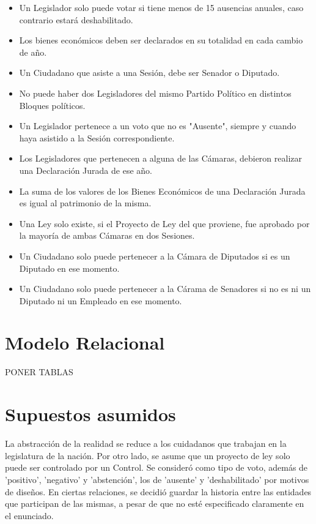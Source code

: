\begin{itemize}
	\item Un Legislador solo puede votar si tiene menos de 15 ausencias anuales, caso contrario estará deshabilitado.
	\item Los bienes económicos deben ser declarados en su totalidad en cada cambio de año.
	\item Un Ciudadano que asiste a una Sesión, debe ser Senador o Diputado. 
	\item No puede haber dos Legisladores del mismo Partido Político en distintos Bloques políticos. 
	\item Un Legislador pertenece a un voto que no es "Ausente", siempre y cuando haya asistido a la Sesión correspondiente.
	\item Los Legisladores que pertenecen a alguna de las Cámaras, debieron realizar una Declaración Jurada de ese año.
	\item La suma de los valores de los Bienes Económicos de una Declaración Jurada es igual al patrimonio de la misma. 
	\item Una Ley solo existe, si el Proyecto de Ley del que proviene, fue aprobado por la mayoría de ambas Cámaras en dos Sesiones. 
	\item Un Ciudadano solo puede pertenecer a la Cámara de Diputados si es un Diputado en ese momento.
	\item Un Ciudadano solo puede pertenecer a la Cárama de Senadores si no es ni un Diputado ni un Empleado en ese momento. 	
	
\end{itemize}

\section{Modelo Relacional}

PONER TABLAS

\section{Supuestos asumidos}
La abstracción de la realidad se reduce a los cuidadanos que trabajan en la legislatura de la nación.
Por otro lado, se asume que un proyecto de ley solo puede ser controlado por un Control.
Se consideró como tipo de voto, además de 'positivo', 'negativo' y 'abstención', los de 'ausente' y 'deshabilitado' por motivos de diseños.
En ciertas relaciones, se decidió guardar la historia entre las entidades que participan de las mismas, a pesar de que no esté especificado claramente en el enunciado.


\begin{itemize}
	
\end{itemize}	
